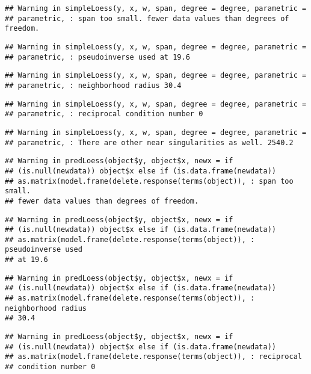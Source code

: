 \documentclass[]{article}
\begin{document}
\begin{verbatim}
## Warning in simpleLoess(y, x, w, span, degree = degree, parametric =
## parametric, : span too small. fewer data values than degrees of freedom.
\end{verbatim}

\begin{verbatim}
## Warning in simpleLoess(y, x, w, span, degree = degree, parametric =
## parametric, : pseudoinverse used at 19.6
\end{verbatim}

\begin{verbatim}
## Warning in simpleLoess(y, x, w, span, degree = degree, parametric =
## parametric, : neighborhood radius 30.4
\end{verbatim}

\begin{verbatim}
## Warning in simpleLoess(y, x, w, span, degree = degree, parametric =
## parametric, : reciprocal condition number 0
\end{verbatim}

\begin{verbatim}
## Warning in simpleLoess(y, x, w, span, degree = degree, parametric =
## parametric, : There are other near singularities as well. 2540.2
\end{verbatim}

\begin{verbatim}
## Warning in predLoess(object$y, object$x, newx = if
## (is.null(newdata)) object$x else if (is.data.frame(newdata))
## as.matrix(model.frame(delete.response(terms(object)), : span too small.
## fewer data values than degrees of freedom.
\end{verbatim}

\begin{verbatim}
## Warning in predLoess(object$y, object$x, newx = if
## (is.null(newdata)) object$x else if (is.data.frame(newdata))
## as.matrix(model.frame(delete.response(terms(object)), : pseudoinverse used
## at 19.6
\end{verbatim}

\begin{verbatim}
## Warning in predLoess(object$y, object$x, newx = if
## (is.null(newdata)) object$x else if (is.data.frame(newdata))
## as.matrix(model.frame(delete.response(terms(object)), : neighborhood radius
## 30.4
\end{verbatim}

\begin{verbatim}
## Warning in predLoess(object$y, object$x, newx = if
## (is.null(newdata)) object$x else if (is.data.frame(newdata))
## as.matrix(model.frame(delete.response(terms(object)), : reciprocal
## condition number 0
\end{verbatim}
\end{document}
